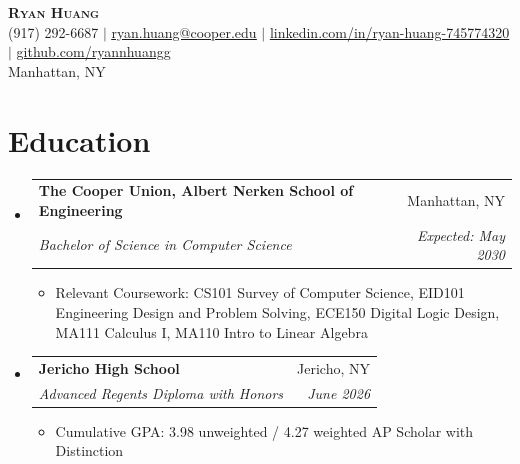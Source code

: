 \documentclass[letterpaper,11pt]{article}
\makeatletter
\newcommand{\resumeItem}[1]{
  \item\small{
    {#1 \vspace{-2pt}}
  }
}
\newcommand{\resumeSubheading}[4]{
  \vspace{-2pt}\item
    \begin{tabular*}{0.97\textwidth}[t]{l@{\extracolsep{\fill}}r}
      \textbf{#1} & #2 \\
      \textit{\small#3} & \textit{\small #4} \\
    \end{tabular*}\vspace{-7pt}
}
\newcommand{\resumeSubHeadingListStart}{\begin{itemize}[leftmargin=0.15in, label={}]}
\newcommand{\resumeSubHeadingListEnd}{\end{itemize}}
\newcommand{\resumeItemListStart}{\begin{itemize}}
\newcommand{\resumeItemListEnd}{\end{itemize}\vspace{-5pt}}
\makeatother
\begin{document}
\begin{center}
    \textbf{\Huge \scshape Ryan Huang} \\ \vspace{1pt}
    \small (917) 292-6687 $|$ \href{mailto:ryan.huang@cooper.edu}{\underline{ryan.huang@cooper.edu}} $|$
    \href{https://linkedin.com/in/ryan-huang-745774320}{\underline{linkedin.com/in/ryan-huang-745774320}} $|$
    \href{https://github.com/ryannhuangg}{\underline{github.com/ryannhuangg}} \\
    Manhattan, NY
\end{center}

\section{Education}
  \resumeSubHeadingListStart
    \resumeSubheading
      {The Cooper Union, Albert Nerken School of Engineering}{Manhattan, NY}
      {Bachelor of Science in Computer Science}{Expected: May 2030}
      \resumeItemListStart
        \resumeItem{Relevant Coursework: CS101 Survey of Computer Science, EID101 Engineering Design and Problem Solving, ECE150 Digital Logic Design, MA111 Calculus I, MA110 Intro to Linear Algebra}
      \resumeItemListEnd
    \resumeSubheading
      {Jericho High School}{Jericho, NY}
      {Advanced Regents Diploma with Honors}{June 2026}
      \resumeItemListStart
        \resumeItem{Cumulative GPA: 3.98 unweighted / 4.27 weighted \textbar{} AP Scholar with Distinction}
      \resumeItemListEnd
  \resumeSubHeadingListEnd
\end{document}

